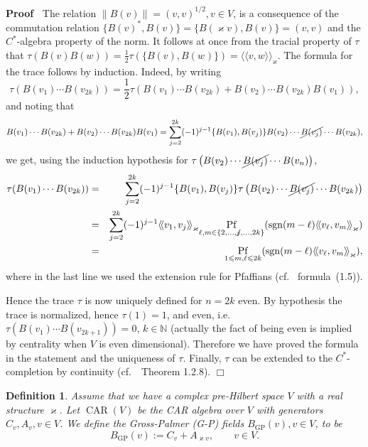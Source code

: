 \documentclass{article}
\newcommand{\assign}{:=}
\newcommand{\llangle}{{\langle\!\langle}}
\newcommand{\rrangle}{{\rangle\!\rangle}}
\newcommand{\tmop}[1]{\ensuremath{\operatorname{#1}}}
\newenvironment{proof}{\noindent\textbf{Proof\ }}{\hspace*{\fill}$\Box$\medskip}
\newtheorem{definition}[theorem]{Definition}
\begin{document}
\begin{proof}
  The relation $\| B (v) \| = (v, v)^{1 / 2}, v \in V$, is a consequence of
  the commutation relation $\{ B (v)^{\ast}, B (v) \} = \{ B (\varkappa v), B
  (v) \} = (v, v)$ and the $C^{\ast}$-algebra property of the norm. It follows
  at once from the tracial property of $\tau$ that $\tau (B (v) B (w)) =
  \tfrac{1}{2} \tau (\{ B (v), B (w_{}) \}) = \llangle v, w
  \rrangle_{\varkappa}$. The formula for the trace follows by induction.
  Indeed, by writing
  \[ \tau (B (v_1) \cdots B (v_{2 k})) = \frac{1}{2} \tau (B (v_1) \cdots B
     (v_{2 k}) + B (v_2) \cdots B (v_{2 k}) B (v_1)), \]
  and noting that
  \[ B (v_1) \cdots B (v_{2 k}) + B (v_2) \cdots B (v_{2 k}) B (v_1) = \sum_{j
     = 2}^{2 k} (- 1)^{j - 1} \{ B (v_1), B (v_j) \} B (v_2) \cdots \cancel{B
     (v_j)} \cdots B (v_{2 k}), \]
  we get, using the induction hypothesis for $\tau \left( B (v_2) \cdots
  \cancel{B (v_j)} \cdots B (v_n) \right)$,
  \begin{eqnarray*}
    \tau (B (v_1) \cdots B (v_{2 k})) & = & \sum^{2 k}_{j = 2} (- 1)^{j - 1}
    \{ B (v_1), B (v_j) \} \tau \left( B (v_2) \cdots \cancel{B (v_j)} \cdots B
    (v_{2 k}) \right)\\
    & = & \sum_{j = 2}^{2 k} (- 1)^{j - 1} \llangle v_1, v_j
    \rrangle_{\varkappa}  \underset{\ell, m \in \left\{ 2, \ldots, \centernot{j},
    \ldots, 2 k \right\}}{\tmop{Pf}} (\tmop{sgn} (m - \ell) \llangle v_{\ell},
    v_m \rrangle_{\varkappa})\\
    & = & \underset{1 \leqslant m, \ell \leqslant 2 k}{\tmop{Pf}} (\tmop{sgn}
    (m - \ell) \llangle v_{\ell}, v_m \rrangle_{\varkappa}),
  \end{eqnarray*}
  where in the last line we used the extension rule for Pfaffians
  (cf.~{\cite{caianiello_combinatorics_1973}} formula~(1.5)).
  
  Hence the trace $\tau$ is now uniquely defined for $n = 2 k$ even. By
  hypothesis the trace is normalized, hence $\tau (1) = 1$, and even, i.e.
  $\tau (B (v_1) \cdots B (v_{2 k + 1})) = 0$, $k \in \mathbb{N}$ (actually
  the fact of being even is implied by centrality when $V$ is even
  dimensional). Therefore we have proved the formula in the statement and the
  uniqueness of $\tau$. Finally, $\tau$ can be extended to the
  $C^{\ast}$-completion by continuity
  (cf.~{\cite{plymen_spinors_1994}}~Theorem 1.2.8).
\end{proof}

\begin{definition}
  \label{def:clifford-car}Assume that we have a complex pre-Hilbert space $V$
  with a real structure $\varkappa$. Let $\tmop{CAR} (V)$ be the CAR algebra
  over $V$ with generators $C_v, A_v, v \in V$. We define the Gross-Palmer
  (G-P) fields $B_{\tmop{GP}} (v), v \in V$, to be
  \[ B_{\tmop{GP}} (v) \assign C_v + A_{\varkappa v}, \qquad v \in V. \]
\end{definition}
\end{document}

